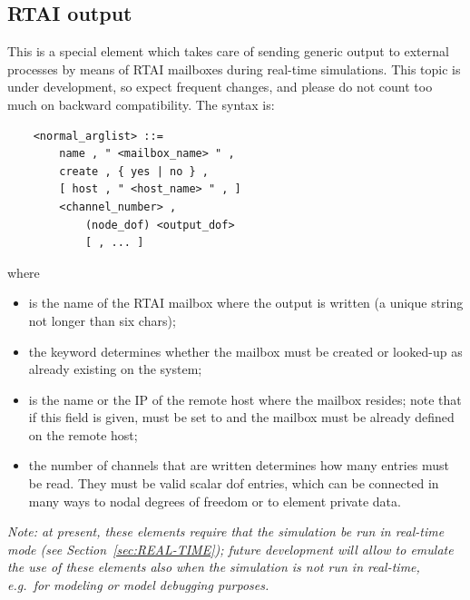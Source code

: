 \subsection{RTAI output}\label{sec:EL:BASE:RTAI_out}
This is a special element which takes care of sending generic output
to external processes by means of RTAI mailboxes during real-time 
simulations.
This topic is under development, so expect frequent changes, and
please do not count too much on backward compatibility.
The syntax is:
\begin{verbatim}
    <normal_arglist> ::=
        name , " <mailbox_name> " ,
        create , { yes | no } ,
        [ host , " <host_name> " , ]
        <channel_number> ,
            (node_dof) <output_dof>
            [ , ... ]
\end{verbatim}
where
\begin{itemize}
\item {} is the name of the RTAI mailbox where 
the output is written  (a unique string not longer than six chars);
\item the  keyword determines whether the mailbox
must be created or looked-up as already existing on the system;
\item {} is the name or the IP of the remote host where
the mailbox resides; note that if this field is given,  must
be set to  and the mailbox must be already defined
on the remote host;
\item the number of channels  that are written
determines how many  entries must be read.
They must be valid scalar dof entries, which can be connected
in many ways to nodal degrees of freedom or to element private data.
\end{itemize}

\emph{Note: at present, these elements require that the simulation
be run in real-time mode (see Section~\ref{sec:REAL-TIME});
future development will allow to emulate the use of these elements
also when the simulation is not run in real-time, e.g.\ for modeling
or model debugging purposes.}






